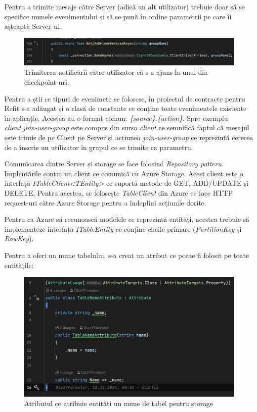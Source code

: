 Pentru a trimite mesaje către Server (adică un alt utilizator) trebuie doar să se specifice numele evenimentului
și să se pună în ordine parametrii pe care îi așteaptă Server-ul.

\begin{figure}[H]
    \centering
    \includegraphics[width=16cm]{Assets/signalrSend.png}
    \caption{Trimiterea notificării către utilizator că s-a ajuns la unul din checkpoint-uri.}
    \label{fig:signalRSend}
\end{figure}

Pentru a știi ce tipuri de evenimete se folosesc, în proiectul de contracte pentru Refit s-a adăugat și o clasă
de constante ce conține toate evenimentele existente în aplicație. Acestea au o format comun:
\textit{\{source\}.\{action\}}. Spre exemplu \textit{client.join-user-group} este compus din sursa \textit{client} ce semnifică faptul că
mesajul este trimis de pe Client pe Server și acțiunea \textit{join-user-group} ce reprezintă cererea de a înscrie un utilizator în grupul ce se trimite ca parametru.

Comunicarea dintre Server și storage se face folosind \textit{Repository pattern}. Implentările conțin un client
ce comunică cu Azure Storage. Acest client este o interfață \textit{ITableClient<TEntity>} ce suportă
metode de GET, ADD/UPDATE și DELETE. Pentru acestea, se folosește \textit{TableClient} din Azure ce face HTTP request-uri
către Azure Storage pentru a îndeplini acțiunile dorite.

Pentru ca Azure să recunoască modelele ce reprezintă entități, acestea trebuie să implementeze interfața
\textit{ITableEntity} ce conține cheile primare (\textit{PartitionKey} și \textit{RowKey}).

Pentru a oferi un nume tabelului, s-a creat un atribut ce poate fi folosit pe toate entitățile:

\begin{figure}[H]
    \centering
    \includegraphics[width=15cm]{Assets/tableAttribute.png}
    \caption{Atributul ce atribuie entități un nume de tabel pentru storage}
    \label{fig:tableAttribute}
\end{figure}

